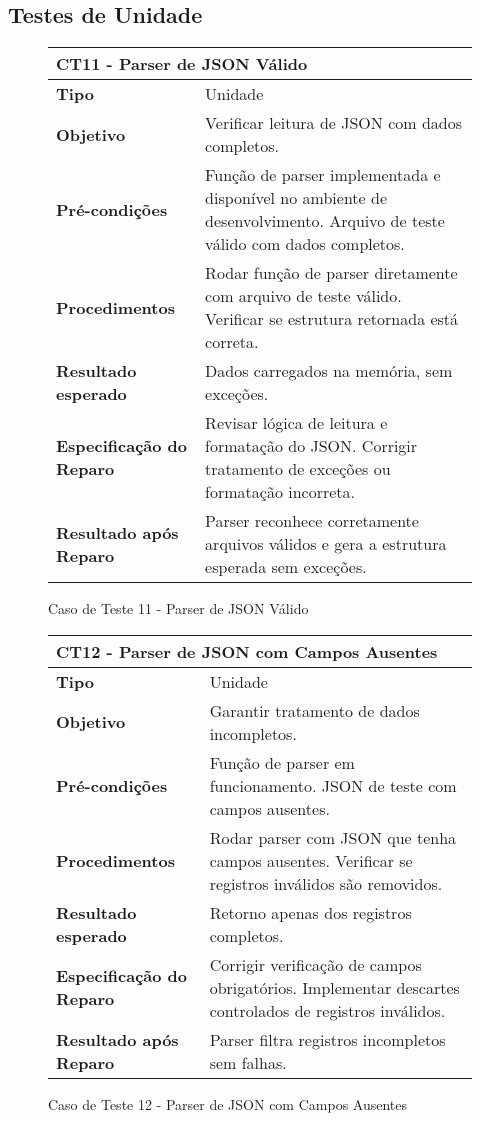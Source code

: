 \subsection*{Testes de Unidade}

\begin{figure}[H]
    \centering
\begin{longtable}{|p{}|p{}|}
\hline
\multicolumn{2}{|l|}{\textbf{CT11 - Parser de JSON Válido}} \\
\hline
\textbf{Tipo} & Unidade \\
\hline
\textbf{Objetivo} & Verificar leitura de JSON com dados completos. \\
\hline
\textbf{Pré-condições} & Função de parser implementada e disponível no ambiente de desenvolvimento.  Arquivo de teste válido com dados completos. \\
\hline
\textbf{Procedimentos} & Rodar função de parser diretamente com arquivo de teste válido.  Verificar se estrutura retornada está correta. \\
\hline
\textbf{Resultado esperado} & Dados carregados na memória, sem exceções. \\
\hline
\textbf{Especificação do Reparo} & Revisar lógica de leitura e formatação do JSON.  Corrigir tratamento de exceções ou formatação incorreta. \\
\hline
\textbf{Resultado após Reparo} & Parser reconhece corretamente arquivos válidos e gera a estrutura esperada sem exceções. \\
\hline
\end{longtable}
\caption{Caso de Teste 11 - Parser de JSON Válido}
\label{fig_ct09_parser_json_valido}
\end{figure}

\begin{figure}[H]
    \centering
\begin{longtable}{|p{}|p{}|}
\hline
\multicolumn{2}{|l|}{\textbf{CT12 - Parser de JSON com Campos Ausentes}} \\
\hline
\textbf{Tipo} & Unidade \\
\hline
\textbf{Objetivo} & Garantir tratamento de dados incompletos. \\
\hline
\textbf{Pré-condições} & Função de parser em funcionamento.  JSON de teste com campos ausentes. \\
\hline
\textbf{Procedimentos} &  Rodar parser com JSON que tenha campos ausentes.  Verificar se registros inválidos são removidos. \\
\hline
\textbf{Resultado esperado} & Retorno apenas dos registros completos. \\
\hline
\textbf{Especificação do Reparo} & Corrigir verificação de campos obrigatórios.  Implementar descartes controlados de registros inválidos. \\
\hline
\textbf{Resultado após Reparo} & Parser filtra registros incompletos sem falhas. \\
\hline
\end{longtable}
\caption{Caso de Teste 12 - Parser de JSON com Campos Ausentes}
\label{fig_ct10_parser_json_campos_ausentes}
\end{figure}

